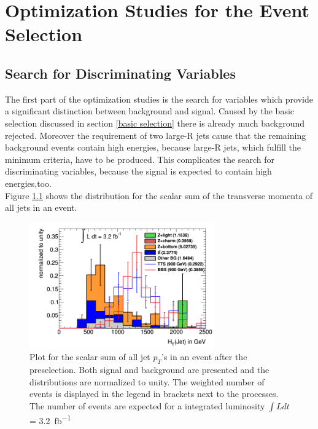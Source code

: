 \chapter{Optimization Studies for the Event Selection}

\section{Search for Discriminating Variables }
\label{distributions}
The first part of the optimization studies is the search for variables which provide a significant distinction between background and signal.
Caused by the basic selection discussed in section \ref{basic selection} there is already much background rejected.
Moreover the requirement of two large-R jets cause that the remaining background events contain high energies, because large-R jets, which fulfill the minimum criteria, have to be produced.
This complicates the search for discriminating variables, because the signal is expected to contain high energies,too.\\
Figure \ref{H_T} shows the distribution for the scalar sum of the transverse momenta of all jets in an event.

\begin{figure}
\centering
\includegraphics[width=8cm]{figures/H_T.png}
\caption{Plot for the scalar sum of all jet $p_{T}$'s in an event after the preselection. 
Both signal and background are presented and the distributions are normalized to unity. 
The weighted number of events is displayed in the legend in brackets next to the processes. 
The number of events are expected for a integrated luminosity $\int L dt$ = \SI{3.2}{fb^{-1}}}
\label{H_T}
\end{figure}

